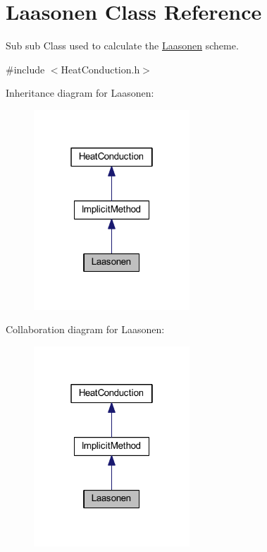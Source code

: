 \hypertarget{class_laasonen}{}\section{Laasonen Class Reference}
\label{class_laasonen}


Sub sub Class used to calculate the \hyperlink{class_laasonen}{Laasonen} scheme.  




{\ttfamily \#include $<$Heat\+Conduction.\+h$>$}



Inheritance diagram for Laasonen\+:\nopagebreak
\begin{figure}[H]
\begin{center}
\leavevmode
\includegraphics[width=166pt]{class_laasonen__inherit__graph}
\end{center}
\end{figure}


Collaboration diagram for Laasonen\+:\nopagebreak
\begin{figure}[H]
\begin{center}
\leavevmode
\includegraphics[width=166pt]{class_laasonen__coll__graph}
\end{center}
\end{figure}
